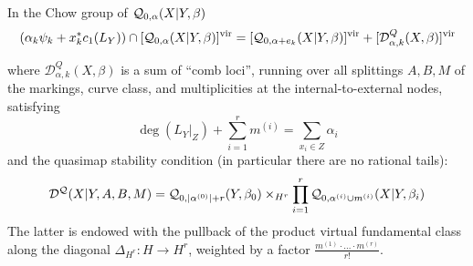 \begin{prop}\label{prop:quasimap_Gathmann_formula} In the Chow group of $\mathcal{Q}_{0,\alpha}(X|Y,\beta)$
 \begin{equation*} (\alpha_k \psi_k + x_k^*c_1(L_Y)) \cap [\mathcal{Q}_{0,\alpha}(X|Y,\beta)]^{\mathrm{vir}} = [\mathcal{Q}_{0,\alpha+e_k}(X|Y,\beta)]^{\mathrm{vir}} + [\mathcal{D}^Q_{\alpha,k}(X,\beta)]^{\mathrm{vir}} \end{equation*}
\end{prop}
\noindent where $\mathcal{D}^Q_{\alpha,k}(X,\beta)$ is a sum of ``comb loci'', running over all splittings $A,B,M$ of the markings, curve class, and multiplicities at the internal-to-external nodes, satisfying
\[\deg(L_{Y}|_Z) + \sum_{i=1}^r m^{(i)} = \sum_{x_i \in Z} \alpha_i\]
and the quasimap stability condition (in particular there are no rational tails):
\[\mathcal D^{\mathcal{Q}}(X|Y,A,B,M)=\mathcal{Q}_{0,\lvert\alpha^{(0)}\rvert+r}(Y,\beta_0)\times_{H^r}\prod_{i=1}^r
\mathcal{Q}_{0,\alpha^{(i)}\cup m^{(i)}}(X|Y,\beta_i)\]
The latter is endowed with the pullback of the product virtual fundamental class along the diagonal $\Delta_{H^r}\colon H\to H^r$, weighted by a factor $\frac{m^{(1)}\cdot\ldots\cdot m^{(r)}}{r!}$.
